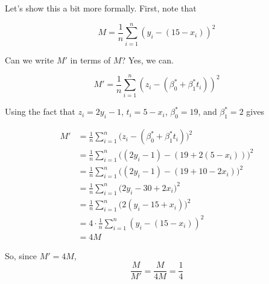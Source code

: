 \documentclass[11pt]{article}
\begin{document}
\begin{prob}
\begin{subprob}
\begin{solution}
Let's show this a bit more formally. First, note that

$$M = \frac{1}{n} \sum_{i=1}^n (y_i - (15 - x_i))^2$$

Can we write $M'$ in terms of $M$? Yes, we can.

$$M' = \frac{1}{n} \sum_{i=1}^n (z_i - (\beta_0^* + \beta_1^* t_i))^2$$

Using the fact that $z_i = 2y_i - 1$, $t_i = 5 - x_i$, $\beta_0^* = 19$, and $\beta_1^* = 2$ gives

\begin{align*}
M' &= \frac{1}{n} \sum_{i=1}^n \big(z_i - (\beta_0^* + \beta_1^* t_i)\big)^2 \\
&= \frac{1}{n} \sum_{i=1}^n \big((2y_i - 1) - (19 + 2 (5 - x_i))\big)^2 \\
&= \frac{1}{n} \sum_{i=1}^n \big((2y_i - 1) - (19 + 10 - 2x_i)\big)^2 \\
&= \frac{1}{n} \sum_{i=1}^n \big(2y_i - 30 + 2x_i\big)^2 \\
&= \frac{1}{n} \sum_{i=1}^n \big(2(y_i - 15 + x_i)\big)^2 \\
&= 4 \cdot \frac{1}{n} \sum_{i=1}^n (y_i - (15 - x_i))^2 \\
&= 4M
\end{align*}

So, since $M' = 4M$, $$\frac{M}{M'} = \frac{M}{4M} = \boxed{\frac{1}{4}}$$
\end{solution}
\end{subprob}

\end{prob}

\newpage
\end{document}
